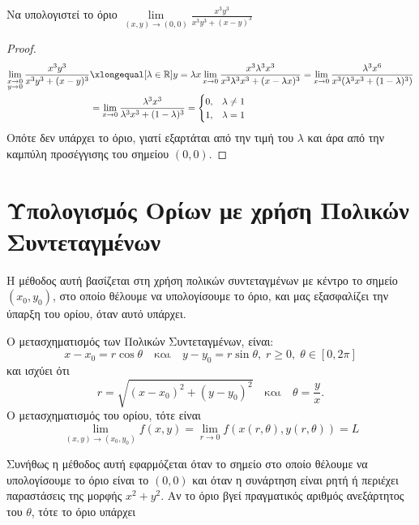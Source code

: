 \begin{example}
    Να υπολογιστεί το όριο $ \lim\limits_{(x,y)\to (0, 0)} \frac{x^{3}y^{3}}{x^{3}y^{3}+ (x-y)^{3}} $ 
    \begin{proof}
    \item {}
        \begin{align*}
            \lim\limits_{\substack{x \to 0\\ y \to 0}} 
            \frac{x^{3}y^{3}}{x^{3}y^{3} + (x-y)^{3}} 
    &\xlongequal[\lambda \in \mathbb{R}]{y = \lambda x} \lim_{x \to 0} 
    \frac{x^{3} \lambda ^{3} x^{3}}{x^{3} \lambda ^{3} x^{3} + (x - \lambda x)^{3}} 
    = \lim_{x \to 0} \frac{\lambda ^{3}x^{6}}{x^{3}
    (\lambda ^{3} x^{3} + (1- \lambda)^{3})} \\
    &= \lim_{x \to 0} \frac{\lambda ^{3} x^{3}}{\lambda ^{3}x^{3} + (1- \lambda)^{3}} 
    = 
    \begin{cases} 
        0, & \lambda \neq 1 \\ 
        1, & \lambda = 1 
    \end{cases} 
        \end{align*} 
        Οπότε δεν υπάρχει το όριο, γιατί εξαρτάται από την τιμή του 
        $ \lambda $ και άρα από την καμπύλη προσέγγισης του σημείου 
        $ (0,0) $.
    \end{proof}
\end{example}

\section{Υπολογισμός Ορίων με χρήση Πολικών Συντεταγμένων}

Η μέθοδος αυτή βασίζεται στη χρήση πολικών συντεταγμένων με κέντρο το σημείο 
$ (x_{0}, y_{0}) $, στο οποίο θέλουμε να υπολογίσουμε το όριο, και μας εξασφαλίζει 
την ύπαρξη του ορίου, όταν αυτό υπάρχει.

\begin{rem}
\item {}
    \begin{myitemize}
    \item Ο μετασχηματισμός των Πολικών Συντεταγμένων, είναι:
        \[
            x - x_{0} = r \cos{\theta} \quad \text{και} \quad y - y_{0} = 
            r \sin{\theta}, \; r \geq 0, \; \theta \in [0, 2 \pi]
        \] 
        και ισχύει ότι 
        \[
            r = \sqrt{(x- x_{0})^{2}+(y- y_{0})^{2}} \quad \text{και} \quad \theta = 
            \frac{y}{x}.
        \] 
        Ο μετασχηματισμός του ορίου, τότε είναι 
        \[
            \lim\limits_{(x,y)\to (x_{0}, y_{0})} f(x,y) = 
            \lim_{r \to 0} f(x(r, \theta ), y(r, \theta)) = L
        \] 


    \item Συνήθως η μέθοδος αυτή εφαρμόζεται όταν το σημείο στο οποίο θέλουμε να 
        υπολογίσουμε το όριο είναι το $ (0,0) $ και όταν η συνάρτηση είναι ρητή ή 
        περιέχει παραστάσεις της μορφής $ x^{2}+y^{2} $. Αν το όριο βγεί 
        πραγματικός αριθμός ανεξάρτητος του $\theta$, τότε το όριο υπάρχει 
    \end{myitemize}
\end{rem}

